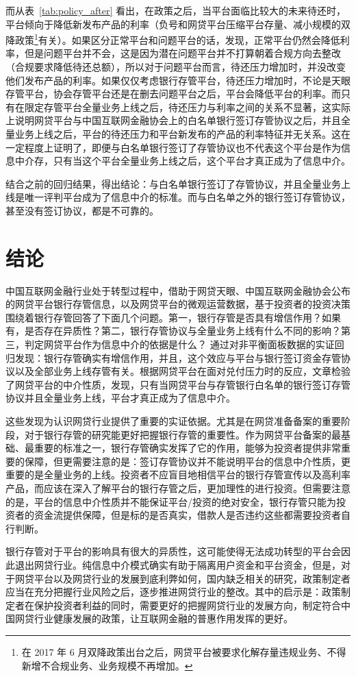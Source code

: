 \documentclass[lang=cn,11pt,authoryear]{elegantpaper}
\begin{document}
而从表~\ref{tab:policy_after} 看出，在政策之后，当平台面临比较大的未来待还时，平台倾向于降低新发布产品的利率（负号和网贷平台压缩平台存量、减小规模的双降政策\footnote{在 2017 年 6 月双降政策出台之后，网贷平台被要求化解存量违规业务、不得新增不合规业务、业务规模不再增加。}有关）。如果区分正常平台和问题平台的话，发现，正常平台仍然会降低利率，但是问题平台并不会，这是因为潜在问题平台并不打算朝着合规方向去整改（合规要求降低待还总额），所以对于问题平台而言，待还压力增加时，并没改变他们发布产品的利率。如果仅仅考虑银行存管平台，待还压力增加时，不论是天眼存管平台，协会存管平台还是在删去问题平台之后，平台会降低平台的利率。而只有在限定存管平台全量业务上线之后，待还压力与利率之间的关系不显著，这实际上说明网贷平台与中国互联网金融协会上的白名单银行签订存管协议之后，并且全量业务上线之后，平台的待还压力和平台新发布的产品的利率特征并无关系。这在一定程度上证明了，即便与白名单银行签订了存管协议也不代表这个平台是作为信息中介存，只有当这个平台全量业务上线之后，这个平台才真正成为了信息中介。

结合之前的回归结果，得出结论：与白名单银行签订了存管协议，并且全量业务上线是唯一评判平台成为了信息中介的标准。而与白名单之外的银行签订存管协议，甚至没有签订协议，都是不可靠的。

\section{结论}
中国互联网金融行业处于转型过程中，借助于网贷天眼、中国互联网金融协会公布的网贷平台银行存管信息，以及网贷平台的微观运营数据，基于投资者的投资决策围绕着银行存管回答了下面几个问题。第一，银行存管是否具有增信作用？如果有，是否存在异质性？第二，银行存管协议与全量业务上线有什么不同的影响？第三，判定网贷平台作为信息中介的依据是什么？
通过对非平衡面板数据的实证回归发现：银行存管确实有增信作用，并且，这个效应与平台与银行签订资金存管协议以及全部业务上线存管有关。根据网贷平台在面对兑付压力时的反应，文章检验了网贷平台的中介性质，发现，只有当网贷平台与存管银行白名单的银行签订存管协议并且全量业务上线，平台才真正成为了信息中介。

这些发现为认识网贷行业提供了重要的实证依据。尤其是在网贷准备备案的重要阶段，对于银行存管的研究能更好把握银行存管的重要性。作为网贷平台备案的最基础、最重要的标准之一，银行存管确实发挥了它的作用，能够为投资者提供非常重要的保障，但更需要注意的是：签订存管协议并不能说明平台的信息中介性质，更重要的是全量业务的上线。投资者不应盲目地相信平台的银行存管宣传以及高利率产品，而应该在深入了解平台的银行存管之后，更加理性的进行投资。但需要注意的是，平台的信息中介性质并不能保证平台/投资的绝对安全，银行存管只能为投资者的资金流提供保障，但是标的是否真实，借款人是否违约这些都需要投资者自行判断。

银行存管对于平台的影响具有很大的异质性，这可能使得无法成功转型的平台会因此退出网贷行业。纯信息中介模式确实有助于隔离用户资金和平台资金，但是，对于网贷平台以及网贷行业的发展到底利弊如何，国内缺乏相关的研究，政策制定者应当在充分把握行业风险之后，逐步推进网贷行业的整改。其中的启示是：政策制定者在保护投资者利益的同时，需要更好的把握网贷行业的发展方向，制定符合中国网贷行业健康发展的政策，让互联网金融的普惠作用发挥的更好。



\end{document}
